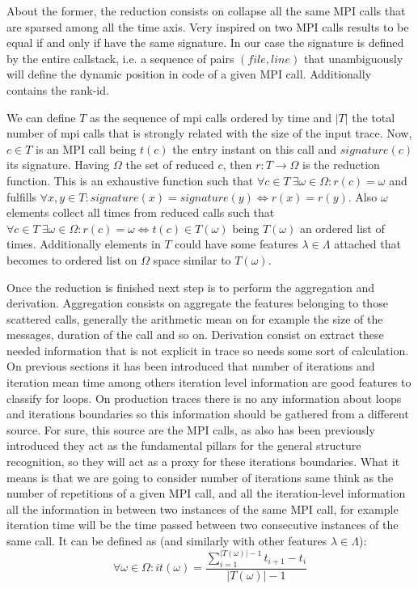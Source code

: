 About the former, the reduction consists on collapse all the same MPI calls that
are sparsed among all the time axis. Very inspired on \cite{noeth2009scalatrace}
two MPI calls
results to be equal if and only if have the same signature. In our case the
signature is defined by the entire callstack, i.e. a sequence of pairs 
$(file, line)$ that unambiguously will define the dynamic position in code of a
given MPI call. Additionally contains the rank-id.

We can define $T$ as the sequence of mpi calls ordered by time and $|T|$ the 
total number of mpi calls that is strongly related with the size of the input trace. 
Now, $c \in T$ is an MPI call being $t(c)$ the entry instant on this call and 
$signature(c)$ its signature. Having 
$\Omega$ the set of reduced $c$, then $r:T\rightarrow\Omega$ is the reduction 
function. This is an exhaustive function such that $\forall c \in T \medspace \exists 
\omega \in \Omega : r(c)=\omega$ and fulfills $\forall x,y \in T : 
signature(x)=signature(y) \Leftrightarrow r(x)=r(y)$. Also $\omega$ elements
collect all times from reduced calls such that $\forall c \in T \medspace
\exists \omega \in \Omega : r(c)=\omega \Leftrightarrow t(c) \in T(\omega)$
being $T(\omega)$ an ordered list of times. Additionally elements in $T$ could 
have some features $\lambda \in \Lambda$ attached that becomes to ordered list 
on $\Omega$ space similar to $T(\omega)$. 

Once the reduction is finished next step is to perform the aggregation and
derivation. Aggregation consists on aggregate the features
belonging to those scattered calls, generally the arithmetic mean on for example
the size of the messages, duration of the call and so on. Derivation 
consist on extract these needed information that is not
explicit in trace so needs some sort of calculation. On previous sections 
it has been introduced that number of iterations and
iteration mean time among others iteration level information are good features 
to classify for loops. On production traces there is no any information about
loops and iterations boundaries so this information should be gathered from a
different source. For sure, this source are the MPI calls, as also has been previously
introduced they act as the fundamental pillars for the general structure
recognition, so they will act as a proxy for these iterations boundaries. What
it means is that we are going to consider number of iterations same think as the
number of repetitions of a given MPI call, and all the iteration-level
information all the information in between two instances of the same MPI call,
for example iteration time will be the time passed between two consecutive
instances of the same call. It can be defined as (and similarly with other
features $\lambda \in \Lambda$): 
$$
\forall \omega \in \Omega : it(\omega)=\frac{\sum\limits_{i=1}^{|T(\omega)|-1} t_{i+1}-t_{i}}{|T(\omega)|-1}
$$

